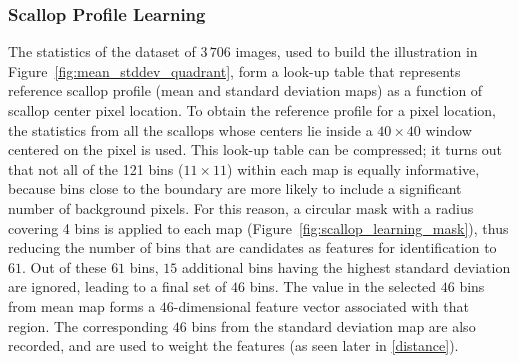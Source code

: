 \documentclass {udthesis}
\begin{document}
\subsubsection{Scallop Profile Learning} \label{subsubsec:scallop_profile_learning}

The statistics of the dataset of $3\,706$ images, used to build the illustration in Figure~\ref{fig:mean_stddev_quadrant}, form a look-up table that represents reference scallop profile (mean and standard deviation maps) 
as a function of scallop center pixel location.
To obtain the reference profile for a pixel location, 
the statistics from all the scallops whose centers lie inside a $40\times40$ window centered on the pixel is used.
This look-up table can be compressed; it turns out that not all of the 121 bins ($11\times11$) within each map is equally informative, because bins close to the boundary are more likely to include a significant number of background pixels.
For this reason, a circular mask with a radius covering 4 bins is applied to each map (Figure~\ref{fig:scallop_learning_mask}), thus reducing the number of bins that are candidates as features for identification to $61$.
Out of these $61$ bins, $15$ additional bins having the highest standard deviation are ignored, leading to a final set of $46$ bins.
The value in the selected $46$ bins from mean map forms a $46$-dimensional feature vector associated with that region. The corresponding $46$ bins from the standard deviation map are also recorded, and are used to weight the features
(as seen later in \eqref{distance}).
\end{document}
